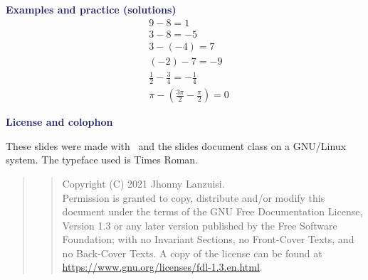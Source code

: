 \documentclass[landscape]{slides}
\newcommand{\colt}[1]{\textcolor{MidnightBlue}{\textbf{#1}}}
\newcommand{\sldt}[1]{\colt{\large #1}}
\begin{document}
\begin{slide}
  \sldt{Examples and practice (solutions)}
  \newcommand{\qmk}{\textcolor{blue}{?}}
  \begin{eqnarray*}
    & 9-8 = 1\\
    & 3-8 = -5 \\
    & 3-(-4) = 7 \\
    & (-2)-7 = -9 \\
    & \frac12 - \frac34 = -\frac14\\
    & \pi - (\frac{3\pi}{2} - \frac\pi2) = 0
  \end{eqnarray*}
\end{slide}

\begin{slide}
\sldt{License and colophon}

These slides were made with \LaTeXe\
and the slides document class
on a GNU/Linux system.
The typeface used is Times Roman.

\begin{quote}\tiny
  \begin{quote}
  Copyright (C)  2021 Jhonny Lanzuisi.\\
  Permission is granted to copy, distribute and/or modify this document
  under the terms of the GNU Free Documentation License, Version 1.3
  or any later version published by the Free Software Foundation;
  with no Invariant Sections, no Front-Cover Texts, and no Back-Cover Texts.
  A copy of the license can be found at
  \url{https://www.gnu.org/licenses/fdl-1.3.en.html}.\par
  \end{quote}
\end{quote}
\end{slide}
\end{document}
